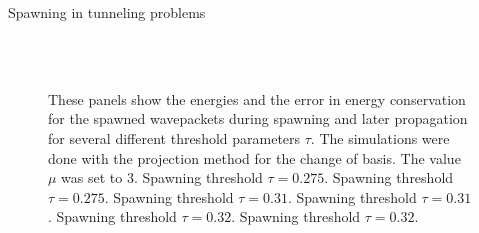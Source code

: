 \begin{chapter}{Spawning in tunneling problems}
\begin{figure}[h!]
{  } \\
   \\
  \caption[Energies and energy drift of the spawned wavepackets during spawning and later propagation]{
  These panels show the energies and the error in energy conservation for the spawned wavepackets
  during spawning and later propagation for several different threshold parameters $\tau$.
  The simulations were done with the projection method for the change of basis. The value $\mu$ was set to 3.
   Spawning threshold $\tau = 0.275$.
   Spawning threshold $\tau = 0.275$.
   Spawning threshold $\tau = 0.31$.
   Spawning threshold $\tau = 0.31$.
   Spawning threshold $\tau = 0.32$.
   Spawning threshold $\tau = 0.32$.
  \label{fig:spawn_propag_project_K100_bs3_energies}
  }
\end{figure}



\end{chapter}
